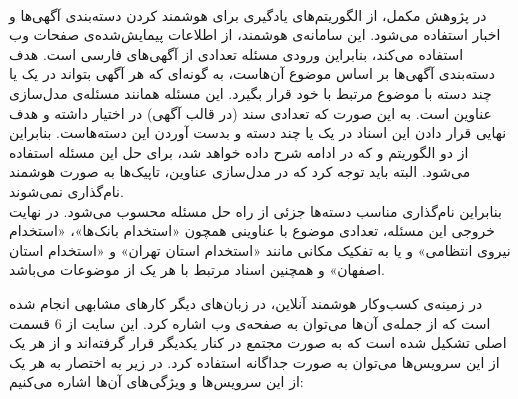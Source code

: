 \\
در پژوهش مکمل، از الگوریتم‌های یادگیری برای هوشمند کردن دسته‌بندی آگهی‌ها و اخبار استفاده می‌شود. این سامانه‌ی هوشمند، از اطلاعات پیمایش‌شده‌ی صفحات وب استفاده می‌کند، بنابراین ورودی مسئله تعدادی از آگهی‌های فارسی است. هدف دسته‌بندی آگهی‌ها بر اساس موضوع آن‌هاست، به گونه‌ای که هر آگهی بتواند در یک یا چند دسته با موضوع مرتبط با خود قرار بگیرد. این مسئله همانند مسئله‌ی مدل‌سازی عناوین است. به این صورت که تعدادی سند (در قالب آگهی) در اختیار داشته و هدف نهایی قرار دادن این اسناد در یک یا چند دسته و بدست آوردن این دسته‌هاست. بنابراین از دو الگوریتم  و  که در ادامه شرح داده خواهد شد، برای حل این مسئله استفاده می‌شود. البته باید توجه کرد که در مدل‌سازی عناوین، تاپیک‌ها به صورت هوشمند نام‌گذاری نمی‌شوند. 
\\
بنابراین نام‌گذاری مناسب دسته‌ها جزئی از راه حل مسئله محسوب می‌شود. در نهایت خروجی این مسئله، تعدادی موضوع با عناوینی همچون «استخدام بانک‌ها»، «استخدام نیروی انتظامی» و یا به تفکیک مکانی مانند «استخدام استان تهران» و «استخدام استان اصفهان» و همچنین اسناد مرتبط با هر یک از موضوعات می‌باشد.


در زمینه‌ی کسب‌و‌کار هوشمند آنلاین، در زبان‌های دیگر کارهای مشابهی انجام شده است که از جمله‌ی آن‌ها می‌توان به صفحه‌ی وب  اشاره کرد. این سایت از 6 قسمت اصلی تشکیل شده است که به صورت مجتمع در کنار یکدیگر قرار گرفته‌اند و از هر یک از این سرویس‌ها می‌توان به صورت جداگانه استفاده کرد. در زیر به اختصار به هر یک از این سرویس‌ها و ویژگی‌های آن‌ها اشاره می‌کنیم:




